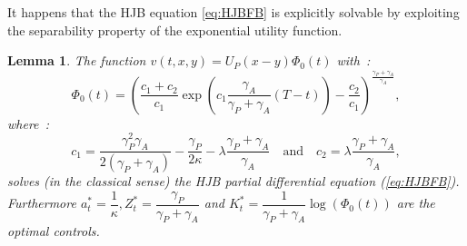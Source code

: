 \documentclass[numbook, envcountsect, envcountsame, envcountreset, runningheads, smallextended]{article}
\newtheorem{Lemma}{Lemma}[part]
\begin{document}
It happens that the HJB equation \eqref{eq:HJBFB} is explicitly solvable by exploiting the separability property of the exponential utility function. 
\begin{Lemma}
\label{lem:V0RSFB}
The function $v(t,x,y)=U_P(x-y) \Phi_0(t)$
with~:
$$\Phi_0(t) = \left(  \frac{c_1 + c_2}{c_1} \exp\left(c_1 \frac{\gamma_A}{\gamma_P + \gamma_A}(T-t)\right) - \frac{c_2}{c_1}\right)^{\frac{\gamma_P+\gamma_A}{\gamma_A}} ,$$
where~:  
$$ c_1 = \frac{\gamma_P^2 \gamma_A}{2(\gamma_P+\gamma_A) } - \frac{\gamma_P}{2\kappa} - \lambda \frac{\gamma_P + \gamma_A}{\gamma_A} \quad \text{and} \quad c_2 = \lambda \frac{\gamma_P + \gamma_A}{\gamma_A},$$
solves (in the classical sense) the HJB partial differential equation (\ref{eq:HJBFB}). \\
Furthermore $a^*_t = \dfrac{1}{\kappa}, Z^*_t = \dfrac{\gamma_P}{\gamma_P + \gamma_A}$ and $K^*_t = \dfrac{1}{\gamma_P + \gamma_A} \log(\Phi_0(t))$ are the optimal controls.
\end{Lemma}
\end{document}
